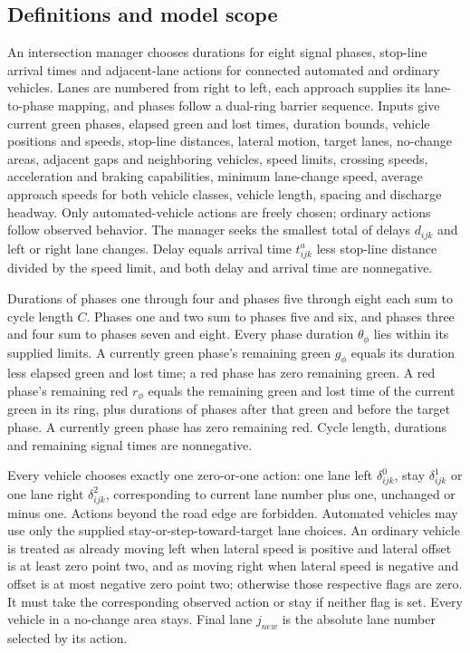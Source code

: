 \documentclass[10pt]{article}
\begin{document}
\subsection*{Definitions and model scope}
An intersection manager chooses durations for eight signal phases, stop-line arrival times and adjacent-lane actions for connected automated and ordinary vehicles. Lanes are numbered from right to left, each approach supplies its lane-to-phase mapping, and phases follow a dual-ring barrier sequence. Inputs give current green phases, elapsed green and lost times, duration bounds, vehicle positions and speeds, stop-line distances, lateral motion, target lanes, no-change areas, adjacent gaps and neighboring vehicles, speed limits, crossing speeds, acceleration and braking capabilities, minimum lane-change speed, average approach speeds for both vehicle classes, vehicle length, spacing and discharge headway. Only automated-vehicle actions are freely chosen; ordinary actions follow observed behavior. The manager seeks the smallest total of delays $d_{ijk}$ and left or right lane changes. Delay equals arrival time $t^a_{ijk}$ less stop-line distance divided by the speed limit, and both delay and arrival time are nonnegative.

Durations of phases one through four and phases five through eight each sum to cycle length $C$. Phases one and two sum to phases five and six, and phases three and four sum to phases seven and eight. Every phase duration $\theta_\phi$ lies within its supplied limits. A currently green phase's remaining green $g_\phi$ equals its duration less elapsed green and lost time; a red phase has zero remaining green. A red phase's remaining red $r_\phi$ equals the remaining green and lost time of the current green in its ring, plus durations of phases after that green and before the target phase. A currently green phase has zero remaining red. Cycle length, durations and remaining signal times are nonnegative.

Every vehicle chooses exactly one zero-or-one action: one lane left $\delta^0_{ijk}$, stay $\delta^1_{ijk}$ or one lane right $\delta^2_{ijk}$, corresponding to current lane number plus one, unchanged or minus one. Actions beyond the road edge are forbidden. Automated vehicles may use only the supplied stay-or-step-toward-target lane choices. An ordinary vehicle is treated as already moving left when lateral speed is positive and lateral offset is at least zero point two, and as moving right when lateral speed is negative and offset is at most negative zero point two; otherwise those respective flags are zero. It must take the corresponding observed action or stay if neither flag is set. Every vehicle in a no-change area stays. Final lane $j_{new}$ is the absolute lane number selected by its action.
\end{document}
